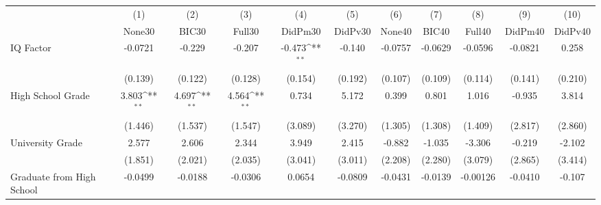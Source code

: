 {
\def\sym#1{\ifmmode^{#1}\else\(^{#1}\)\fi}
\begin{tabular}{l*{10}{c}}
\toprule
            &\multicolumn{1}{c}{(1)}&\multicolumn{1}{c}{(2)}&\multicolumn{1}{c}{(3)}&\multicolumn{1}{c}{(4)}&\multicolumn{1}{c}{(5)}&\multicolumn{1}{c}{(6)}&\multicolumn{1}{c}{(7)}&\multicolumn{1}{c}{(8)}&\multicolumn{1}{c}{(9)}&\multicolumn{1}{c}{(10)}\\
            &\multicolumn{1}{c}{None30}&\multicolumn{1}{c}{BIC30}&\multicolumn{1}{c}{Full30}&\multicolumn{1}{c}{DidPm30}&\multicolumn{1}{c}{DidPv30}&\multicolumn{1}{c}{None40}&\multicolumn{1}{c}{BIC40}&\multicolumn{1}{c}{Full40}&\multicolumn{1}{c}{DidPm40}&\multicolumn{1}{c}{DidPv40}\\
\midrule
IQ Factor   &     -0.0721         &      -0.229         &      -0.207         &      -0.473\sym{**} &      -0.140         &     -0.0757         &     -0.0629         &     -0.0596         &     -0.0821         &       0.258         \\
            &     (0.139)         &     (0.122)         &     (0.128)         &     (0.154)         &     (0.192)         &     (0.107)         &     (0.109)         &     (0.114)         &     (0.141)         &     (0.210)         \\
\addlinespace
High School Grade&       3.803\sym{**} &       4.697\sym{**} &       4.564\sym{**} &       0.734         &       5.172         &       0.399         &       0.801         &       1.016         &      -0.935         &       3.814         \\
            &     (1.446)         &     (1.537)         &     (1.547)         &     (3.089)         &     (3.270)         &     (1.305)         &     (1.308)         &     (1.409)         &     (2.817)         &     (2.860)         \\
\addlinespace
University Grade&       2.577         &       2.606         &       2.344         &       3.949         &       2.415         &      -0.882         &      -1.035         &      -3.306         &      -0.219         &      -2.102         \\
            &     (1.851)         &     (2.021)         &     (2.035)         &     (3.041)         &     (3.011)         &     (2.208)         &     (2.280)         &     (3.079)         &     (2.865)         &     (3.414)         \\
\addlinespace
Graduate from High School&     -0.0499         &     -0.0188         &     -0.0306         &      0.0654         &     -0.0809         &     -0.0431         &     -0.0139         &    -0.00126         &     -0.0410         &      -0.107         \\

\end{tabular}}
